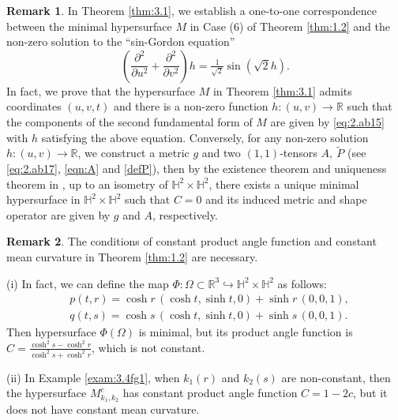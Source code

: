\documentclass[reqno]{amsart}%
\theoremstyle{definition}
\newtheorem{remark}{Remark}[section]
\numberwithin{equation}{section}
\begin{document}
\begin{remark}\label{rem:1.2}
In Theorem \ref{thm:3.1}, we establish a one-to-one correspondence between the minimal hypersurface $M$ in Case (6) of Theorem \ref{thm:1.2} and the non-zero solution to the ``sin-Gordon equation'' 
\begin{equation*}%
(\frac{\partial^2}{\partial u^2}+\frac{\partial^2}{\partial v^2})h
=\tfrac{1}{\sqrt{2}}\sin(\sqrt{2}h).
\end{equation*}
In fact, we prove that the hypersurface $M$ in Theorem \ref{thm:3.1} admits coordinates $(u,v,t)$ and there is a non-zero function $h:(u,v)\to\mathbb{R}$ such that the components of the
second fundamental form of $M$ are given by \eqref{eq:2.ab15} with $h$ satisfying the above equation.
Conversely, for any non-zero solution $h:(u,v)\rightarrow \mathbb{R}$, we construct a metric $g$ and two
$(1,1)$-tensors $A,~\tilde{P}$ (see \eqref{eq:2.ab17}, \eqref{eqn:A} and \eqref{defP}), then by the existence theorem
and uniqueness theorem in \cite{K,L-T-V}, up to an isometry of $\mathbb{H}^2\times\mathbb{H}^2$, there exists a unique minimal hypersurface in $\mathbb{H}^2\times\mathbb{H}^2$
such that $C=0$ and its induced metric and shape operator  are given by $g$ and $A$,
respectively.
\end{remark}

\begin{remark}\label{rem:1.3}
The conditions of constant product angle function and constant mean curvature in Theorem \ref{thm:1.2} are necessary.

(i) In fact, we can define the map $\Phi:\Omega\subset \mathbb{R}^3\hookrightarrow\mathbb{H}^2\times\mathbb{H}^2$ as follows:
%
\begin{equation}\label{eqn:1.1a1a1}
\begin{aligned}
&p(t,r)=\cosh r\,(\cosh t,\sinh t,0)+\sinh r\,(0,0,1),\\
&q(t,s)=\cosh s\,(\cosh t,\sinh t,0)+\sinh s\,(0,0,1).
\end{aligned}
\end{equation}
Then hypersurface $\Phi(\Omega)$ is minimal, but its product angle function is $C=\frac{\cosh^2 s-\cosh^2 r}{\cosh^2 s+\cosh^2 r}$, which is not constant.

%
(ii) In Example \ref{exam:3.4fg1}, when $k_1(r)$ and $k_2(s)$ are non-constant,
then the hypersurface $M_{k_1,k_2}^c$ has constant product angle function $C=1-2c$,
but it does not have constant mean curvature.
\end{remark}
\end{document}
